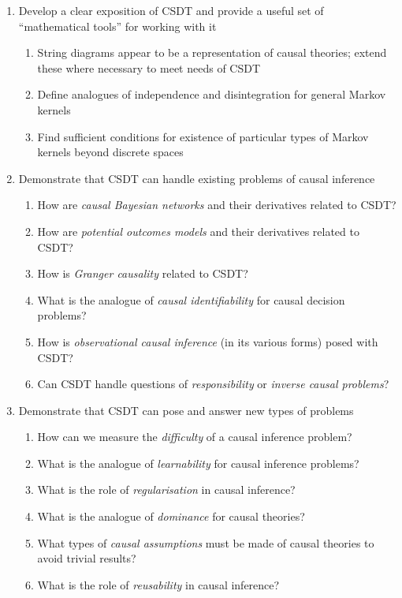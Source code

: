 \begin{enumerate}
	\item Develop a clear exposition of CSDT and provide a useful set of ``mathematical tools'' for working with it
	\begin{enumerate}
		\item String diagrams appear to be a representation of causal theories; extend these where necessary to meet needs of CSDT
		\item Define analogues of independence and disintegration for general Markov kernels
		\item Find sufficient conditions for existence of particular types of Markov kernels beyond discrete spaces
	\end{enumerate}
	\item Demonstrate that CSDT can handle existing problems of causal inference
	\begin{enumerate}
		\item How are \emph{causal Bayesian networks} and their derivatives related to CSDT?
		\item How are \emph{potential outcomes models} and their derivatives related to CSDT?
		\item How is \emph{Granger causality} related to CSDT?	
		\item What is the analogue of \emph{causal identifiability} for causal decision problems?
		\item How is \emph{observational causal inference} (in its various forms) posed with CSDT?
		\item Can CSDT handle questions of \emph{responsibility} or \emph{inverse causal problems}?
	\end{enumerate}
	\item Demonstrate that CSDT can pose and answer new types of problems
	\begin{enumerate}
		\item How can we measure the \emph{difficulty} of a causal inference problem?
		\item What is the analogue of \emph{learnability} for causal inference problems?
		\item What is the role of \emph{regularisation} in causal inference?
		\item What is the analogue of \emph{dominance} for causal theories?
		\item What types of \emph{causal assumptions} must be made of causal theories to avoid trivial results?
		\item What is the role of \emph{reusability} in causal inference?
	\end{enumerate}
\end{enumerate}

